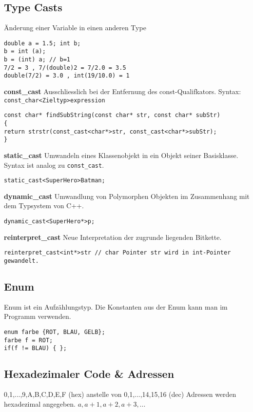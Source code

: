 \subsection{Type Casts}
Änderung einer Variable in einen anderen Type
\begin{lstlisting}	
double a = 1.5; int b;
b = int (a);
b = (int) a; // b=1
7/2 = 3 , 7/(double)2 = 7/2.0 = 3.5
double(7/2) = 3.0 , int(19/10.0) = 1
\end{lstlisting}
\textbf{const\_cast}
Ausschliesslich bei der Entfernung des const-Qualifkators. Syntax: \texttt{const\_char<Zieltyp>expression}
\begin{lstlisting}	
const char* findSubString(const char* str, const char* subStr)
{
return strstr(const_cast<char*>str, const_cast<char*>subStr);
}
\end{lstlisting}

\textbf{static\_cast}
Umwandeln eines Klassenobjekt in ein Objekt seiner Basisklasse. Syntax ist analog zu \texttt{const\_cast}.
\begin{lstlisting}	
static_cast<SuperHero>Batman;
\end{lstlisting}


\textbf{dynamic\_cast}
Umwandlung von Polymorphen Objekten im Zusammenhang mit dem Typsystem von C++.
\begin{lstlisting}	
dynamic_cast<SuperHero*>p;
\end{lstlisting}


\textbf{reinterpret\_cast}
Neue Interpretation der zugrunde liegenden Bitkette.
\begin{lstlisting}	
reinterpret_cast<int*>str // char Pointer str wird in int-Pointer gewandelt.
\end{lstlisting}


\subsection{Enum}
Enum ist ein Aufzählungstyp. Die Konstanten aus der Enum
kann man im Programm verwenden.
\begin{lstlisting}	
enum farbe {ROT, BLAU, GELB};
farbe f = ROT;
if(f != BLAU) { }; 
\end{lstlisting}

\subsection{Hexadezimaler Code \& Adressen}
0,1,...,9,A,B,C,D,E,F (hex) anstelle von 0,1,...,14,15,16 (dec)
Adressen werden hexadezimal angegeben. $a,a+1,a+2,a+3,...$


